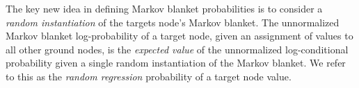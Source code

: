 \documentclass[twoside,leqno,twocolumn]{article}
\begin{document}
The key new idea in defining Markov blanket probabilities is to consider a {\em random instantiation} of the targets node's Markov blanket. 
The unnormalized Markov blanket log-probability of a target node, given an assignment of  values to all other ground nodes, is the {\em expected value} of the unnormalized log-conditional probability given a single random instantiation of the Markov blanket. We refer to this as the {\em random regression} probability of a target node value. 

\end{document}
